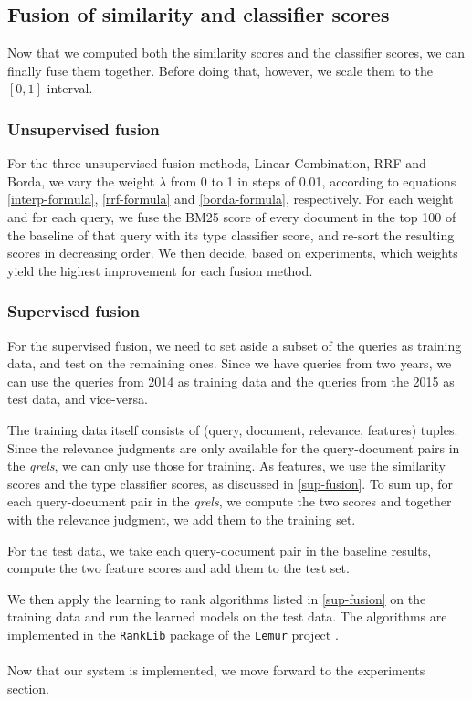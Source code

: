 \subsection{Fusion of similarity and classifier scores}
Now that we computed both the similarity scores and the classifier scores, we can finally fuse them together.
Before doing that, however, we scale them to the $[0,1]$ interval.

\subsubsection{Unsupervised fusion}\label{impl-unsup}
For the three unsupervised fusion methods, Linear Combination, RRF and Borda, we vary the weight $\lambda$ from 0 to 1 in steps of 0.01,
according to equations \ref{interp-formula}, \ref{rrf-formula} and \ref{borda-formula}, respectively. 
For each weight and for each query, we fuse the BM25
score of every document in the top 100 of the baseline of that query with its type classifier score, 
and re-sort the resulting scores in decreasing order.
We then decide, based on experiments, which weights yield the highest improvement for each fusion method.

\subsubsection{Supervised fusion}\label{impl-sup}
For the supervised fusion, we need to set aside a subset of the queries as training data, and test on the remaining ones.
Since we have queries from two years, we can use the queries from 2014 as training data and the queries from
the 2015 as test data, and vice-versa.

The training data itself consists of (query, document, relevance, features) tuples. Since the relevance judgments are only available
for the query-document pairs in the \emph{qrels}, we can only use those for training. As features, we use the 
similarity scores and the type classifier scores, as discussed in \ref{sup-fusion}. To sum up, for each
query-document pair in the \emph{qrels}, we compute the two scores and together with the relevance judgment, we add them
to the training set.

For the test data, we take each query-document pair in the baseline results, compute the two feature scores and add them
to the test set.

We then apply the learning to rank algorithms listed in \ref{sup-fusion} on the training data and run the learned models on the test data.
The algorithms are implemented in the \texttt{RankLib} package of the \texttt{Lemur} project \cite{ranklib}.
\\
\\
Now that our system is implemented, we move forward to the experiments section.





